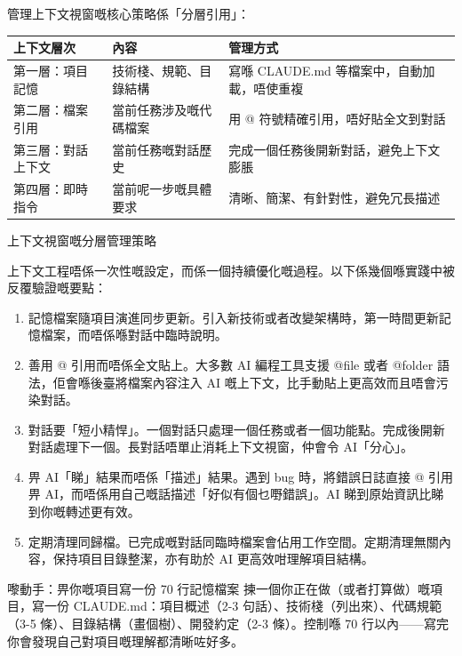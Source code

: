管理上下文視窗嘅核心策略係「分層引用」：

\begin{center}
\begin{tabularx}{\linewidth}{|X|X|X|}
\hline
\textbf{上下文層次} & \textbf{內容} & \textbf{管理方式} \tabularnewline
\hline
第一層：項目記憶 & 技術棧、規範、目錄結構 & 寫喺 CLAUDE.md 等檔案中，自動加載，唔使重複 \tabularnewline
第二層：檔案引用 & 當前任務涉及嘅代碼檔案 & 用 @ 符號精確引用，唔好貼全文到對話 \tabularnewline
第三層：對話上下文 & 當前任務嘅對話歷史 & 完成一個任務後開新對話，避免上下文膨脹 \tabularnewline
第四層：即時指令 & 當前呢一步嘅具體要求 & 清晰、簡潔、有針對性，避免冗長描述 \tabularnewline
\hline
\end{tabularx}
\end{center}

\begin{center}\small\color{gray}上下文視窗嘅分層管理策略\end{center}


上下文工程唔係一次性嘅設定，而係一個持續優化嘅過程。以下係幾個喺實踐中被反覆驗證嘅要點：

\begin{enumerate}
  \item 記憶檔案隨項目演進同步更新。引入新技術或者改變架構時，第一時間更新記憶檔案，而唔係喺對話中臨時說明。
  \item 善用 @ 引用而唔係全文貼上。大多數 AI 編程工具支援 @file 或者 @folder 語法，佢會喺後臺將檔案內容注入 AI 嘅上下文，比手動貼上更高效而且唔會污染對話。
  \item 對話要「短小精悍」。一個對話只處理一個任務或者一個功能點。完成後開新對話處理下一個。長對話唔單止消耗上下文視窗，仲會令 AI「分心」。
  \item 畀 AI「睇」結果而唔係「描述」結果。遇到 bug 時，將錯誤日誌直接 @ 引用畀 AI，而唔係用自己嘅話描述「好似有個乜嘢錯誤」。AI 睇到原始資訊比睇到你嘅轉述更有效。
  \item 定期清理同歸檔。已完成嘅對話同臨時檔案會佔用工作空間。定期清理無關內容，保持項目目錄整潔，亦有助於 AI 更高效咁理解項目結構。
\end{enumerate}

\begin{tcbpractice}{嚟動手：畀你嘅項目寫一份 70 行記憶檔案}
揀一個你正在做（或者打算做）嘅項目，寫一份 CLAUDE.md：項目概述（2-3 句話）、技術棧（列出來）、代碼規範（3-5 條）、目錄結構（畫個樹）、開發約定（2-3 條）。控制喺 70 行以內——寫完你會發現自己對項目嘅理解都清晰咗好多。

\end{tcbpractice}

